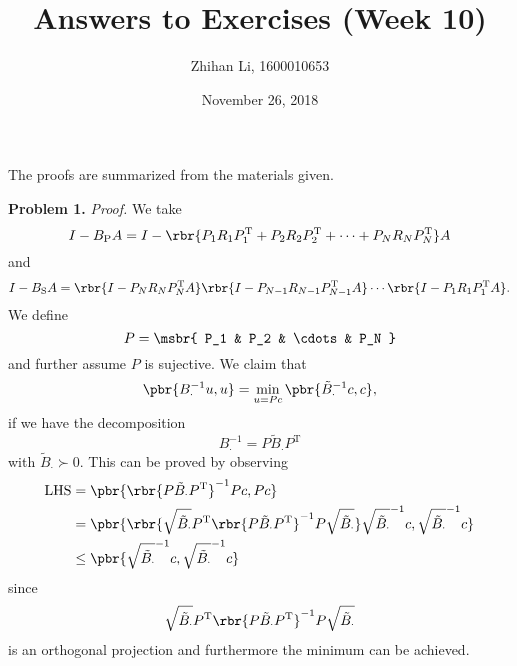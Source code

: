 \documentclass[english, nochinese]{pnote}
\title{
    Answers to Exercises (Week 10)}
\author{Zhihan Li, 1600010653}
\date{November 26, 2018}
\begin{document}
\maketitle

The proofs are summarized from the materials given.

\textbf{Problem 1.} \textit{Proof.} We take
\begin{equation}
I - B_{\text{P}} A = I - \rbr{ P_1 R_1 P_1^{\text{T}} + P_2 R_2 P_2^{\text{T}} + \cdots + P_N R_N P_N^{\text{T}} } A
\end{equation}
and
\begin{equation}
I - B_{\text{S}} A = \rbr{ I - P_N R_N P_N^{\text{T}} A } \rbr{ I - P_{ N - 1 } R_{ N - 1 } P_{ N - 1 }^{\text{T}} A } \cdots \rbr{ I - P_1 R_1 P_1^{\text{T}} A }.
\end{equation}
We define
\begin{equation}
P = \msbr{ P_1 & P_2 & \cdots & P_N }
\end{equation}
and further assume $P$ is sujective. We claim that
\begin{equation} \label{Eq:MinThm}
\pbr{ B_{\cdot}^{-1} u, u } = \min_{ u = P c } \pbr{ \tilde{B}_{\cdot}^{-1} c, c },
\end{equation}
if we have the decomposition
\begin{equation}
B_{\cdot}^{-1} = P \tilde{B}_{\cdot} P^{\text{T}}
\end{equation}
with $ \tilde{B}_{\cdot} \succ 0 $. This can be proved by observing
\begin{equation}
\begin{split}
\text{LHS} &= \pbr{ \rbr{ P \tilde{B}_{\cdot} P^{\text{T}} }^{-1} P c, P c } \\
&= \pbr{ \rbr{ \sqrt{\tilde{B}_{\cdot}} P^{\text{T}} \rbr{ P \tilde{B}_{\cdot} P^{\text{T}} }^{-1} P \sqrt{\tilde{B}_{\cdot}} } \sqrt{\tilde{B}_{\cdot}}^{-1} c, \sqrt{\tilde{B}_{\cdot}}^{-1} c } \\
&\le \pbr{ \sqrt{\tilde{B}_{\cdot}}^{-1} c, \sqrt{\tilde{B}_{\cdot}}^{-1} c }
\end{split}
\end{equation}
since
\begin{equation}
\sqrt{\tilde{B}_{\cdot}} P^{\text{T}} \rbr{ P \tilde{B}_{\cdot} P^{\text{T}} }^{-1} P \sqrt{\tilde{B}_{\cdot}}
\end{equation}
is an orthogonal projection and furthermore the minimum can be achieved.
\end{document}
